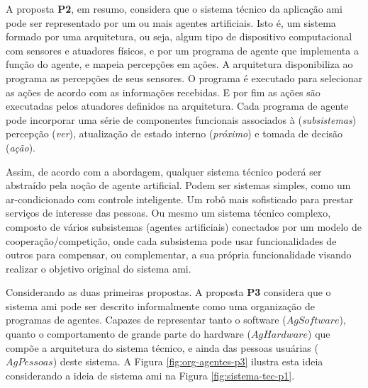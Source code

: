     A proposta \textbf{P2}, em resumo, considera que o sistema técnico da aplicação \acrshort{ami} pode ser representado por um ou mais agentes artificiais. Isto é, um sistema formado por uma arquitetura, ou seja, algum tipo de dispositivo computacional com sensores e atuadores físicos, e por um programa de agente que implementa a função do agente, e mapeia percepções em ações. A arquitetura disponibiliza ao programa as percepções de seus sensores. O programa é executado para selecionar as ações de acordo com as informações recebidas. E por fim as ações são executadas pelos atuadores definidos na arquitetura. Cada programa de agente pode incorporar uma série de componentes funcionais associados à (\emph{subsistemas}) percepção (\emph{ver}), atualização de estado interno (\emph{próximo}) e tomada de decisão (\emph{ação}).
    
    Assim, de acordo com a abordagem, qualquer sistema técnico poderá ser abstraído pela noção de agente artificial. Podem ser sistemas simples, como um ar-condicionado com controle inteligente. Um robô mais sofisticado para prestar serviços de interesse das pessoas. Ou mesmo um sistema técnico complexo, composto de vários subsistemas (agentes artificiais) conectados por um modelo de cooperação/competição, onde cada subsistema pode usar funcionalidades de outros para compensar, ou complementar, a sua própria funcionalidade visando realizar o objetivo original do sistema \acrshort{ami}.
    
    Considerando as duas primeiras propostas. A proposta \textbf{P3} considera que o sistema \acrshort{ami} pode ser descrito informalmente como uma organização de programas de agentes. Capazes de representar tanto o software ($AgSoftware$), quanto o comportamento de grande parte do hardware ($AgHardware$) que compõe a arquitetura do sistema técnico, e ainda das pessoas usuárias ($AgPessoas$) deste sistema. A Figura \ref{fig:org-agentes-p3} ilustra esta ideia considerando a ideia de sistema \acrshort{ami} na Figura \ref{fig:sistema-tec-p1}.
    
    \begin{figure}[h!]
        \centering
    \end{figure}
    
